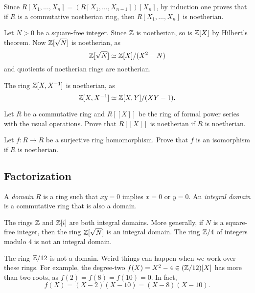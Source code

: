Since $R[X_1,\dots,X_n]=(R[X_1,\dots,X_{n-1}])[X_n]$, by induction 
one proves that if $R$ is a commutative noetherian ring, 
then $R[X_1,\dots,X_n]$ is noetherian. 
 
\begin{example}
    Let $N>0$ be a square-free integer.  
	Since $\mathbb{Z}$ is noetherian, so is $\mathbb{Z}[X]$ by Hilbert's theorem. Now 
	$\mathbb{Z}[\sqrt{N}]$ is noetherian, as \[
    \mathbb{Z}[\sqrt{N}]\simeq\mathbb{Z}[X]/(X^2-N)
    \]
    and quotients
	of noetherian rings are noetherian.  	
\end{example}

\begin{example}
	The ring $\mathbb{Z}[X,X^{-1}]$ is noetherian, as 
    \[
    \mathbb{Z}[X,X^{-1}]\simeq\mathbb{Z}[X,Y]/(XY-1).
    \]
\end{example}
 

\begin{exercise}
    Let $R$ be a commutative ring and $R[\![X]\!]$ be the ring of formal power series with the usual operations.  
	Prove that $R[\![X]\!]$ is noetherian if $R$ is noetherian. 	
\end{exercise}

\begin{exercise}
	Let $f\colon R\to R$ be a surjective ring homomorphism. Prove that $f$ is an isomorphism
	if $R$ is noetherian. 	
\end{exercise}

\subsection{Factorization}

\begin{definition}
    A \emph{domain} $R$ is a ring such that $xy=0$ implies $x=0$ or $y=0$. 
    An \emph{integral domain} is a commutative ring that is also a domain. 
\end{definition}

The rings $\mathbb{Z}$ and $\mathbb{Z}[i]$ are both integral domains. 
More generally, if $N$ is a square-free integer, 
then the ring $\mathbb{Z}[\sqrt{N}]$ is an integral domain.  
The ring $\mathbb{Z}/4$ of 
integers modulo 4 is not an integral domain. 

\begin{example}
    The ring $\mathbb{Z}/12$ is not a domain. Weird things can happen 
    when we work over these rings. For example, the degree-two  
    $f(X)=X^2-4\in(\mathbb{Z}/12)[X]$ has more than two roots, 
    as $f(2)=f(8)=f(10)=0$. In fact, 
    \[
    f(X)=(X-2)(X-10)=(X-8)(X-10).
    \]
\end{example}

